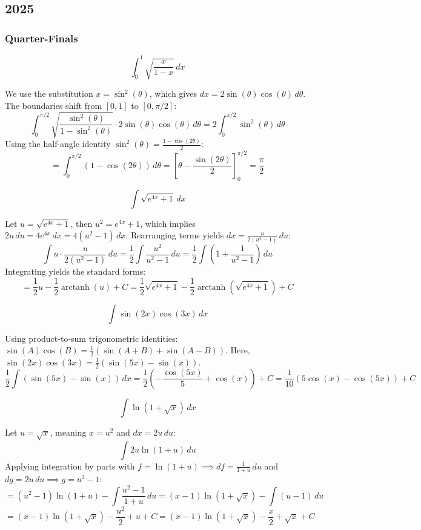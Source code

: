 \subsection*{2025}

\subsubsection*{Quarter-Finals}

\begin{questions}

\question
\[ \int_{0}^{1} \sqrt{\frac{x}{1-x}} \, dx \]
\begin{solution}
We use the substitution $x = \sin^2(\theta)$, which gives $dx = 2\sin(\theta)\cos(\theta) \, d\theta$. The boundaries shift from $[0, 1]$ to $[0, \pi/2]$:
\[ \int_{0}^{\pi/2} \sqrt{\frac{\sin^2(\theta)}{1-\sin^2(\theta)}} \cdot 2\sin(\theta)\cos(\theta) \, d\theta = 2\int_{0}^{\pi/2} \sin^2(\theta) \, d\theta \]
Using the half-angle identity $\sin^2(\theta) = \frac{1-\cos(2\theta)}{2}$:
\[ = \int_{0}^{\pi/2} (1 - \cos(2\theta)) \, d\theta = \left[ \theta - \frac{\sin(2\theta)}{2} \right]_{0}^{\pi/2} = \frac{\pi}{2} \]
\end{solution}

\question
\[ \int \sqrt{e^{4x}+1} \, dx \]
\begin{solution}
Let $u = \sqrt{e^{4x}+1}$, then $u^2 = e^{4x}+1$, which implies $2u \, du = 4e^{4x} \, dx = 4(u^2-1) \, dx$. Rearranging terms yields $dx = \frac{u}{2(u^2-1)} \, du$:
\[ \int u \cdot \frac{u}{2(u^2-1)} \, du = \frac{1}{2}\int \frac{u^2}{u^2-1} \, du = \frac{1}{2}\int \left( 1 + \frac{1}{u^2-1} \right) \, du \]
Integrating yields the standard forms:
\[ = \frac{1}{2}u - \frac{1}{2}\operatorname{arctanh}(u) + C = \frac{1}{2}\sqrt{e^{4x}+1} - \frac{1}{2}\operatorname{arctanh}\left(\sqrt{e^{4x}+1}\right) + C \]
\end{solution}

\question
\[ \int \sin(2x)\cos(3x) \, dx \]
\begin{solution}
Using product-to-sum trigonometric identities: $\sin(A)\cos(B) = \frac{1}{2}(\sin(A+B) + \sin(A-B))$. Here, $\sin(2x)\cos(3x) = \frac{1}{2}(\sin(5x) - \sin(x))$.
\[ \frac{1}{2}\int (\sin(5x) - \sin(x)) \, dx = \frac{1}{2}\left(-\frac{\cos(5x)}{5} + \cos(x)\right) + C = \frac{1}{10}(5\cos(x)-\cos(5x)) + C \]
\end{solution}

\question
\[ \int \ln(1+\sqrt{x}) \, dx \]
\begin{solution}
Let $u = \sqrt{x}$, meaning $x = u^2$ and $dx = 2u \, du$:
\[ \int 2u\ln(1+u) \, du \]
Applying integration by parts with $f = \ln(1+u) \implies df = \frac{1}{1+u} \, du$ and $dg = 2u \, du \implies g = u^2 - 1$:
\[ = (u^2-1)\ln(1+u) - \int \frac{u^2-1}{1+u} \, du = (x-1)\ln(1+\sqrt{x}) - \int (u-1) \, du \]
\[ = (x-1)\ln(1+\sqrt{x}) - \frac{u^2}{2} + u + C = (x-1)\ln(1+\sqrt{x}) - \frac{x}{2} + \sqrt{x} + C \]
\end{solution}


\end{questions}
